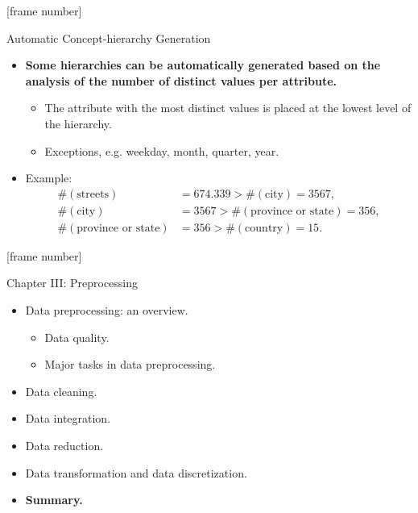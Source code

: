 \documentclass[aspectratio=169,t]{beamer}
\begin{document}
  {
    [frame number]
    \begin{frame}{Automatic Concept-hierarchy Generation}
        \begin{itemize}
            \item \textbf{Some hierarchies can be automatically generated based on the analysis of the number of distinct values per attribute.}
            \begin{itemize}
              \item The attribute with the most distinct values is placed at the lowest level of the hierarchy.
              \item Exceptions, e.g. weekday, month, quarter, year.
            \end{itemize}
            \item Example:
            \begin{align}
            \#(\text{streets}) &= 674.339 > \#(\text{city}) =  3567,\\
            \#(\text{city}) &=  3567 > \#(\text{province or state}) =  356,\\
            \#(\text{province or state}) &=  356 > \#(\text{country}) = 15.
            \end{align}
        \end{itemize}
    \end{frame}
  }

  {
    [frame number]
    \begin{frame}{Chapter III: Preprocessing}
        \begin{itemize}
            \item Data preprocessing: an overview.
            \begin{itemize}
              \item Data quality.
              \item Major tasks in data preprocessing.
            \end{itemize}
            \item Data cleaning.
            \item Data integration.
            \item Data reduction.
            \item Data transformation and data discretization.
            \item \textbf{Summary.}
        \end{itemize}
    \end{frame}
  }
\end{document}
